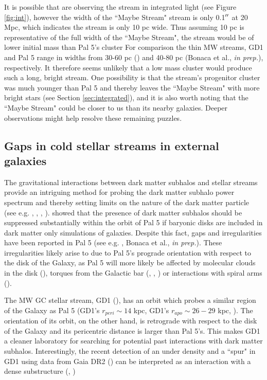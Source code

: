 \documentclass[twocolumn]{aastex62}
\begin{document}
It is possible that \citet{abraham18} are observing the stream in integrated light (see Figure \ref{fig:int}), however the width of the ``Maybe Stream" stream is only 0.1$\mbox{$^{\prime\prime}$}$ at 20 Mpc, which indicates the stream is only 10 pc wide. Thus assuming 10 pc is representative of the full width of the ``Maybe Stream", the stream would be of lower initial mass than Pal 5's cluster For comparison the thin MW streams, GD1 and Pal 5 range in widths from 30-60 pc (\citealt{price18}) and 40-80 pc (Bonaca et al., {\it in prep.}), respectively. It therefore seems unlikely that a low mass cluster would produce such a long, bright stream. One possibility is that the stream's progenitor cluster was much younger than Pal 5 and thereby leaves the ``Maybe Stream" with more bright stars (see  Section \ref{sec:integrated}), and it is also worth noting that the  ``Maybe Stream" could be closer to us than its nearby galaxies. Deeper observations might help resolve these remaining puzzles. 

\subsection{Gaps in cold stellar streams in external galaxies}
The gravitational interactions between dark matter subhalos and stellar streams provide an intriguing method for probing the dark matter subhalo power spectrum and thereby setting limits on the nature of the dark matter particle (see e.g. \citealt{erkal16}, \citealt{bovy17}, \citealt{price18}, \citealt{bonaca19}). \citet{garrison17} showed that the presence of dark matter subhalos should be suppressed substantially within the orbit of Pal 5 if baryonic disks are included in dark matter only simulations of galaxies.  Despite this fact, gaps and irregularities have been reported in Pal 5 (see e.g. \citealt{erkal17}, Bonaca et al., {\it in prep.}). These irregularities likely arise to due to Pal 5's prograde orientation with respect to the disk of the Galaxy, as Pal 5 will more likely be affected by molecular clouds in the disk (\citealt{amorisco16}), torques from the Galactic bar (\citealt{hattori16}, \citealt{erkal17}, \citealt{pearson17}) or interactions with spiral arms (\citealt{banik19}).

The MW GC stellar stream, GD1 (\citealt{grillmair06}), has an orbit which probes a similar region of the Galaxy as Pal 5 (GD1's $r_{peri} \sim 14$ kpc, GD1's $r_{apo} \sim 26-29$ kpc, \citealt{koposov10}). The orientation of its orbit, on the other hand, is retrograde with respect to the disk of the Galaxy and its pericentric distance is larger than Pal 5's. This makes GD1 a cleaner laboratory for searching for potential past interactions with dark matter subhalos. Interestingly, the recent detection of an under density and a ``spur" in GD1 using data from Gaia DR2 (\citealt{gaiadr2}) can be interpreted as an interaction with a dense substructure (\citealt{price18}, \citealt{bonaca19})
\end{document}
